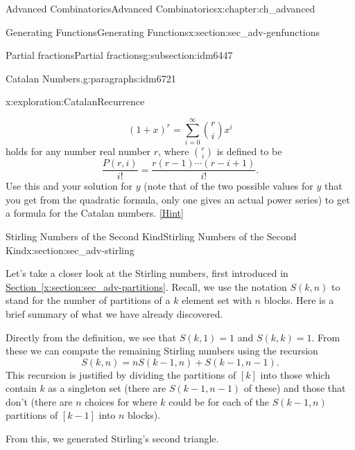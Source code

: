 \documentclass[oneside,10pt,]{book}
\numberwithin{equation}{chapter}
\begin{document}
\begin{chapterptx}{Advanced Combinatorics}{}{Advanced Combinatorics}{}{}{x:chapter:ch_advanced}
\begin{sectionptx}{Generating Functions}{}{Generating Functions}{}{}{x:section:sec_adv-genfunctions}
\begin{subsectionptx}{Partial fractions}{}{Partial fractions}{}{}{g:subsection:idm6447}
\begin{paragraphs}{Catalan Numbers.}{g:paragraphs:idm6721}
\begin{exploration}{}{x:exploration:CatalanRecurrence}
\begin{enumerate}[font=\bfseries,label=(\alph*),ref=\alph*]
\begin{equation*}
(1+x)^r = \sum_{i=0}^\infty \binom{r}{i}x^i
\end{equation*}
holds for any number real number \(r\), where \(\binom{r}{i}\) is defined to be%
\begin{equation*}
\frac{P(r,i)}{i!} = \frac{r(r-1)\cdots(r-i+1)}{i!}\text{.}
\end{equation*}
Use this and your solution for \(y\) (note that of the two possible values for \(y\) that you get from the quadratic formula, only one gives an actual power series) to get a formula for the Catalan numbers.%
\space\hspace*{0pt}\hfill{\tiny\hyperlink{g:hint:idm6764-back}{[Hint]}}\end{enumerate}
\end{exploration}
\end{paragraphs}%
\end{subsectionptx}
\end{sectionptx}
%
%
\typeout{************************************************}
\typeout{************************************************}
%
\begin{sectionptx}{Stirling Numbers of the Second Kind}{}{Stirling Numbers of the Second Kind}{}{}{x:section:sec_adv-stirling}
\begin{introduction}{}%
Let's take a closer look at the Stirling numbers, first introduced in \hyperref[x:section:sec_adv-partitions]{Section~\ref{x:section:sec_adv-partitions}}.  Recall, we use the notation \(S(k,n)\) to stand for the number of partitions of a \(k\) element set with \(n\) blocks.  Here is a brief summary of what we have already discovered.%
\par
Directly from the definition, we see that \(S(k,1) = 1\) and \(S(k,k) = 1\).  From these we can compute the remaining Stirling numbers using the recursion%
\begin{equation*}
S(k,n) = nS(k-1,n) + S(k-1, n-1).
\end{equation*}
This recursion is justified by dividing the partitions of \([k]\) into those which contain \(k\) as a singleton set (there are \(S(k-1, n-1)\) of these) and those that don't (there are \(n\) choices for where \(k\) could be for each of the \(S(k-1, n)\) partitions of \([k-1]\) into \(n\) blocks).%
\par
From this, we generated Stirling's second triangle.%
\begin{sidebyside}{1}{0.25}{0.25}{0}%

\end{sidebyside}
\end{introduction}
\end{sectionptx}
\end{chapterptx}
\end{document}
